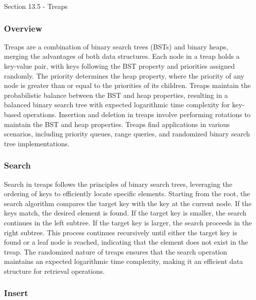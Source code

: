 \begin{notes}{Section 13.5 - Treaps}
    \subsubsection*{Overview}

    Treaps are a combination of binary search trees (BSTs) and binary heaps, merging the advantages of both data structures. Each node in a treap holds a key-value pair, with keys following the BST 
    property and priorities assigned randomly. The priority determines the heap property, where the priority of any node is greater than or equal to the priorities of its children. Treaps maintain 
    the probabilistic balance between the BST and heap properties, resulting in a balanced binary search tree with expected logarithmic time complexity for key-based operations. Insertion and deletion 
    in treaps involve performing rotations to maintain the BST and heap properties. Treaps find applications in various scenarios, including priority queues, range queries, and randomized binary search 
    tree implementations.
    
    \subsubsection*{Search}
    
    Search in treaps follows the principles of binary search trees, leveraging the ordering of keys to efficiently locate specific elements. Starting from the root, the search algorithm compares the target 
    key with the key at the current node. If the keys match, the desired element is found. If the target key is smaller, the search continues in the left subtree. If the target key is larger, the search 
    proceeds in the right subtree. This process continues recursively until either the target key is found or a leaf node is reached, indicating that the element does not exist in the treap. The randomized 
    nature of treaps ensures that the search operation maintains an expected logarithmic time complexity, making it an efficient data structure for retrieval operations.
    
    \subsubsection*{Insert}
    

\end{notes}
